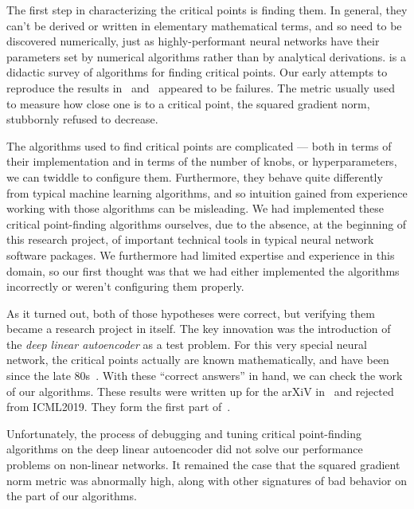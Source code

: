 \documentclass[../../thesis.tex]{subfiles}
\begin{document}
The first step in characterizing the critical points is finding them.
In general, they can't be derived or written in elementary mathematical terms,
and so need to be discovered numerically,
just as highly-performant neural networks have their parameters set
by numerical algorithms rather than by analytical derivations.
 is a didactic survey of algorithms
for finding critical points.
Our early attempts to reproduce the results
in~\cite{dauphin2014} and~\cite{pennington2017}
appeared to be failures.
The metric usually used to measure how close one is
to a critical point, the squared gradient norm,
stubbornly refused to decrease.

The algorithms used to find critical points are complicated ---
both in terms of their implementation and
in terms of the number of knobs, or hyperparameters,
we can twiddle to configure them.
Furthermore, they behave quite differently
from typical machine learning algorithms,
and so intuition gained from experience working with those algorithms
can be misleading.
We had implemented these critical point-finding algorithms ourselves,
due to the absence, at the beginning of this research project,
of important technical tools in typical neural network software packages.
We furthermore had limited expertise and experience in this domain,
so our first thought was that we had either implemented the algorithms incorrectly
or weren't configuring them properly.

As it turned out, both of those hypotheses were correct,
but verifying them became a research project in itself.
The key innovation was the introduction of the \emph{deep linear autoencoder}
as a test problem.
For this very special neural network,
the critical points actually are known mathematically,
and have been since the late 80s~\cite{baldi1989}.
With these \enquote{correct answers} in hand,
we can check the work of our algorithms.
These results were written up for the arXiV
in~\cite{frye2019}
and rejected from ICML2019.
They form the first part of~.

Unfortunately, the process of debugging and tuning critical point-finding
algorithms on the deep linear autoencoder did not solve
our performance problems on non-linear networks.
It remained the case that the squared gradient norm metric was abnormally high,
along with other signatures of bad behavior on the part of our algorithms.
\end{document}
